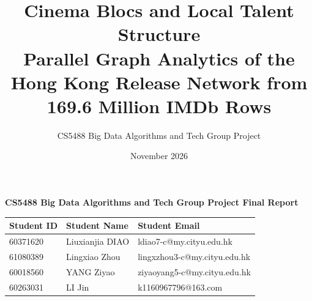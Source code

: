 \documentclass[11pt,a4paper]{article}
\title{Cinema Blocs and Local Talent Structure \\[0.4em] \large Parallel Graph Analytics of the Hong Kong Release Network from 169.6 Million IMDb Rows}
\author{CS5488 Big Data Algorithms and Tech \textemdash{} Group Project}
\date{November 2026}
\begin{document}
\maketitle

\textbf{CS5488 Big Data Algorithms and Tech \textemdash{} Group Project Final Report}

\begin{table}[H]
\centering
\footnotesize
\begin{tabularx}{\textwidth}{lXX}
\toprule
Student ID & Student Name & Student Email \\
\midrule
60371620 & Liuxianjia DIAO & ldiao7-c@my.cityu.edu.hk \\
61080389 & Lingxiao Zhou & lingxzhou3-c@my.cityu.edu.hk \\
60018560 & YANG Ziyao & ziyaoyang5-c@my.cityu.edu.hk \\
60263031 & LI Jin & k1160967796@163.com \\
\bottomrule
\end{tabularx}
\end{table}


\tableofcontents
\clearpage










\end{document}
